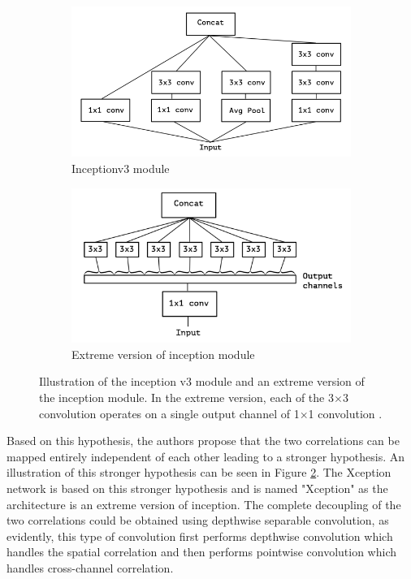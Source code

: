 	\begin{figure}
		\begin{subfigure}{.5\textwidth}
			\centering
			\includegraphics[width=1\linewidth]{images/inception_v3}
			\caption{Inceptionv3 module}
			\label{Fig:xceptiona}
		\end{subfigure}
		\begin{subfigure}{.5\textwidth}
			\centering
			\includegraphics[width=1\linewidth]{images/extreme_inception}
			\caption{Extreme version of inception module}
			\label{Fig:xceptionb}
		\end{subfigure}
		\caption{Illustration of the inception v3 module and an extreme version of the inception module. In the extreme version, each of the 3$\times$3 convolution operates on a single output channel of 1$\times$1 convolution \cite{DBLP:journals/corr/Chollet16a}.}
		\label{Fig:xception}
	\end{figure}

Based on this hypothesis, the authors propose that the two correlations can be mapped entirely independent of each other leading to a stronger hypothesis. An illustration of this stronger hypothesis can be seen in Figure \ref{Fig:xceptionb}. The Xception network is based on this stronger hypothesis and is named "Xception" as the architecture is an extreme version of inception. The complete decoupling of the two correlations could be obtained using depthwise separable convolution, as evidently, this type of convolution first performs depthwise convolution which handles the spatial correlation and then performs pointwise convolution which handles cross-channel correlation.

